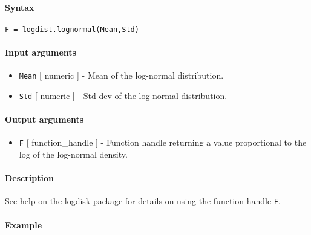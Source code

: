 


	\paragraph{Syntax}

\begin{verbatim}
F = logdist.lognormal(Mean,Std)
\end{verbatim}

\paragraph{Input arguments}

\begin{itemize}
\item
  \texttt{Mean} {[} numeric {]} - Mean of the log-normal distribution.
\item
  \texttt{Std} {[} numeric {]} - Std dev of the log-normal distribution.
\end{itemize}

\paragraph{Output arguments}

\begin{itemize}
\itemsep1pt\parskip0pt
\item
  \texttt{F} {[} function\_handle {]} - Function handle returning a
  value proportional to the log of the log-normal density.
\end{itemize}

\paragraph{Description}

See \href{logdist/Contents}{help on the logdisk package} for details on
using the function handle \texttt{F}.

\paragraph{Example}


